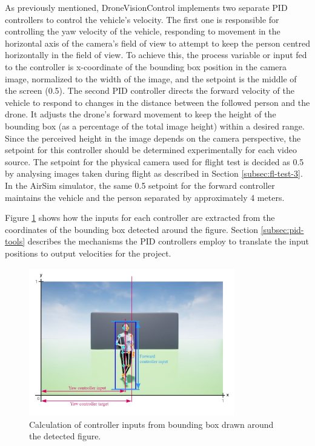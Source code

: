  
As previously mentioned, DroneVisionControl implements two separate PID controllers to control the vehicle's velocity.
The first one is responsible for controlling the yaw velocity of the vehicle, responding to movement in the horizontal axis of the camera's field of view to attempt to keep the person centred horizontally in the field of view. To achieve this, the process variable or input fed to the controller is x-coordinate of the bounding box position in the camera image, normalized to the width of the image, and the setpoint is the middle of the screen (0.5).
The second PID controller directs the forward velocity of the vehicle to respond to changes in the distance between the followed person and the drone. It adjusts the drone's forward movement to keep the height of the bounding box (as a percentage of the total image height) within a desired range. Since the perceived height in the image depends on the camera perspective, the setpoint for this controller should be determined experimentally for each video source. The setpoint for the physical camera used for flight test is decided as 0.5 by analysing images taken during flight as described in Section \ref{subsec:fl-test-3}. In the AirSim simulator, the same 0.5 setpoint for the forward controller maintains the vehicle and the person separated by approximately 4 meters.

Figure \ref{fig:follow-input-calcs} shows how the inputs for each controller are extracted from the coordinates of the bounding box detected around the figure. Section \ref{subsec:pid-tools} describes the mechanisms the PID controllers employ to translate the input positions to output velocities for the project.
\begin{figure}[H]
  \centering
  \includegraphics[width=0.8\textwidth, keepaspectratio]{img/pose-calculations.jpg}
  \caption{Calculation of controller inputs from bounding box drawn around the detected figure.}
  \label{fig:follow-input-calcs}
\end{figure}


